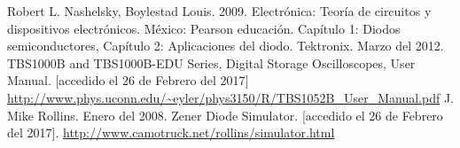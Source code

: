 \documentclass[twoside,twocolumn,a4paper]{article}
\begin{document}

\begin{thebibliography}{99} %

 Robert L. Nashelsky, Boylestad Louis. 2009. Electr\'onica: Teor\'ia de circuitos y dispositivos electr\'onicos. M\'exico: Pearson educaci\'on. Cap\'itulo 1: Diodos semiconductores, Cap\'itulo 2: Aplicaciones del diodo.
 Tektronix. Marzo del 2012. TBS1000B and TBS1000B-EDU Series, Digital Storage Oscilloscopes, User Manual. [accedido el 26 de Febrero del 2017] \url{http://www.phys.uconn.edu/~eyler/phys3150/R/TBS1052B_User_Manual.pdf}
 J. Mike Rollins. Enero del 2008. Zener Diode Simulator. [accedido el 26 de Febrero del 2017]. \url{http://www.camotruck.net/rollins/simulator.html}
 
\end{thebibliography}

\end{document}
